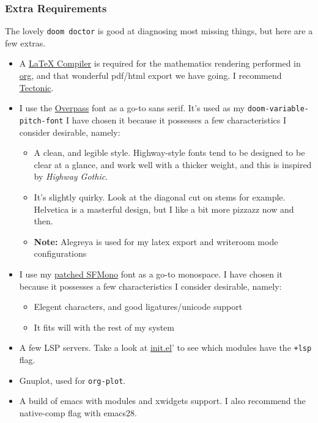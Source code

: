 \documentclass{scrartcl}
\begin{document}
\subsubsection{Extra Requirements}
\label{sec:org6cc7653}
The lovely \texttt{doom doctor} is good at diagnosing most missing things, but here are a
few extras.
\begin{itemize}
\item A \href{https://www.tug.org/texlive/}{\LaTeX{} Compiler} is required for the mathematics rendering performed in \href{https://orgmode.org/}{org},
and that wonderful pdf/html export we have going. I recommend \href{https://github.com/tectonic-typesetting/tectonic}{Tectonic}.
\item I use the \href{https://overpassfont.org/}{Overpass} font as a go-to sans serif.
It's used as my \texttt{doom-variable-pitch-font}
I have chosen it because it possesses a few characteristics I consider
desirable, namely:
\begin{itemize}
\item A clean, and legible style. Highway-style fonts tend to be designed to be
clear at a glance, and work well with a thicker weight, and this is inspired
by \emph{Highway Gothic}.
\item It's slightly quirky. Look at the diagonal cut on stems for example.
Helvetica is a masterful design, but I like a bit more pizzazz now and then.
\item \textbf{Note:} Alegreya is used for my latex export and writeroom mode configurations
\end{itemize}
\item I use my \href{https://github.com/shaunsingh/SFMono-Nerd-Font-Ligaturized}{patched SFMono} font as a go-to monospace.
I have chosen it because it possesses a few characteristics I consider
desirable, namely:
\begin{itemize}
\item Elegent characters, and good ligatures/unicode support
\item It fits will with the rest of my system
\end{itemize}
\item A few LSP servers. Take a look at \href{init.el}{init.el}' to see which modules have the \texttt{+lsp}
flag.
\item Gnuplot, used for \texttt{org-plot}.
\item A build of emacs with modules and xwidgets support. I also recommend the
native-comp flag with emacs28.
\end{itemize}
\end{document}
